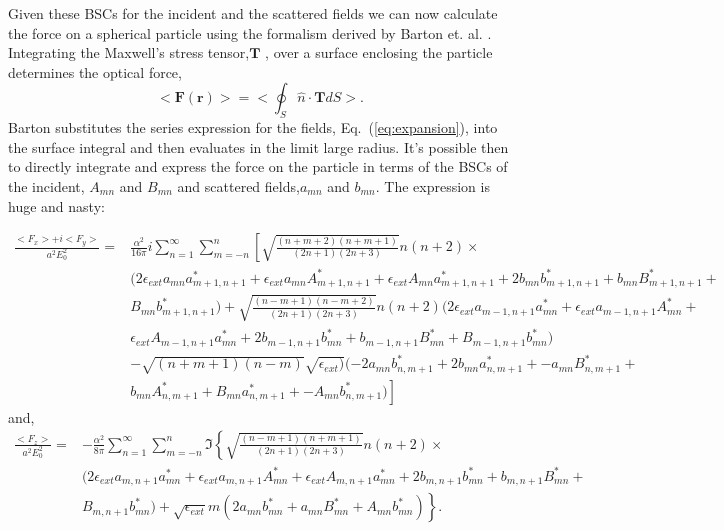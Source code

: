 \documentclass[aps,prl,twocolumn]{revtex4-1}
\newcommand{\pos}{\left(\mathbf{r} \right)}
\begin{document}
Given these BSCs for the incident and the scattered fields
we can now calculate the force on a spherical particle
using the formalism derived by Barton et. al. \cite{barton_theoretical_1989}.
Integrating the Maxwell's stress tensor,$\mathbf{T}$ ,
 over a surface enclosing the particle
determines the optical force,
\begin{equation}
  \label{eq:maxwellforce}
  <\mathbf{F} \pos> = < \oint_S \hat{n} \cdot \mathbf{T} dS >.
\end{equation}
Barton substitutes the series expression for the fields,
 Eq.~(\ref{eq:expansion}), into the surface integral and then evaluates
in the limit large radius. It's possible then to directly integrate
and express the force on the particle in terms of the BSCs of the 
incident, $A_{mn}$ and $B_{mn}$ and scattered fields,$a_{mn}$ and $b_{mn}$. The
 expression is huge and nasty:
\begin{widetext}
\begin{align}
  \label{eq:forcexy}
  \frac{<F_x>+i<F_y>}{a^2 E_0^2} = 
     & \frac{\alpha^2}{16 \pi} i \sum_{n=1}^{\infty}\sum_{m=-n}^{n}
        \left[\sqrt{\frac{(n+m+2)(n+m+1)}{(2n+1)(2n+3)}}n(n+2) \times \right.\\
           & \left.(2 \epsilon_{ext} a_{mn}a_{m+1,n+1}^*+
              \epsilon_{ext} a_{mn}A_{m+1,n+1}^*+
              \epsilon_{ext} A_{mn}a_{m+1,n+1}^*+
              2 b_{mn}b_{m+1,n+1}^*+
              b_{mn}B_{m+1,n+1}^*+ \right. \\
              & \left. B_{mn}b_{m+1,n+1}^* ) +
           \sqrt{\frac{(n-m+1)(n-m+2)}{(2n+1)(2n+3)}}n(n+2) (
              2 \epsilon_{ext} a_{m-1,n+1}a_{mn}^*+
              \epsilon_{ext} a_{m-1,n+1}A_{mn}^*+ \right. \\
              & \left. \epsilon_{ext} A_{m-1,n+1}a_{mn}^*+
              2 b_{m-1,n+1}b_{mn}^*+
              b_{m-1,n+1}B_{mn}^*+
              B_{m-1,n+1}b_{mn}^*) \right. \\
           & \left. -\sqrt{(n+m+1)(n-m)}\sqrt{\epsilon_{ext})} (
              -2 a_{mn}b_{n,m+1}^*+
              2 b_{mn}a_{n,m+1}^*+
              -a_{mn}B_{n,m+1}^*+\right. \\
              & \left. b_{mn}A_{n,m+1}^*+
              B_{mn}a_{n,m+1}^*+
              -A_{mn}b_{n,m+1}^*)\right]
\end{align}
and,
\begin{align}
  \label{eq:forcez}
  \frac{<F_z>}{a^2 E_0^2} =
     & -\frac{\alpha^2}{8 \pi} \sum_{n=1}^{\infty}\sum_{m=-n}^{n} \Im 
        \left\{ \sqrt{\frac{(n-m+1)(n+m+1)}{(2n+1)(2n+3)}}n(n+2)\times
            \right. \\
            & \left. (2 \epsilon_{ext} a_{m,n+1}a_{mn}^*+ 
               \epsilon_{ext} a_{m,n+1}A_{mn}^*+
               \epsilon_{ext} A_{m,n+1}a_{mn}^*+
               2 b_{m,n+1}b_{mn}^*+ 
               b_{m,n+1}B_{mn}^*+ \right.\\
               & \left. B_{m,n+1}b_{mn}^*)+
            \sqrt{\epsilon_{ext}}m(2a_{mn}b_{mn}^*+
               a_{mn}B_{mn}^*+
               A_{mn}b_{mn}^*)\right\}.
\end{align}
\end{widetext}
\end{document}
